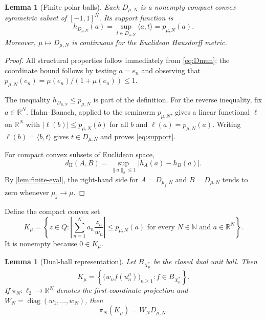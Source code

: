 \documentclass[11pt]{article}
\newtheorem{lemma}[theorem]{Lemma}
\theoremstyle{definition}
\newcommand{\N}{\mathbb N}
\newcommand{\R}{\mathbb R}
\newcommand{\ellTwo}{\ell_2}
\newcommand{\Ball}{B}
\newcommand{\Haus}{d_{\mathrm H}}
\begin{document}
\begin{lemma}[Finite polar balls]\label{lem:finite-polar}
Each $D_{\mu,N}$ is a nonempty compact convex symmetric subset of
$[-1,1]^N$.  Its support function is
\[
 h_{D_{\mu,N}}(a)=\sup_{t\in D_{\mu,N}}\langle a,t\rangle
 =p_{\mu,N}(a).
 \tag{4.6}\label{eq:support}
\]
Moreover, $\mu\mapsto D_{\mu,N}$ is continuous for the Euclidean Hausdorff
metric.
\end{lemma}

\begin{proof}
All structural properties follow immediately from \eqref{eq:Dmun}; the coordinate
bound follows by testing $a=e_n$ and observing that
$p_{\mu,N}(e_n)=\mu(e_n)/(1+\mu(e_n))\leq1$.

The inequality $h_{D_{\mu,N}}\leq p_{\mu,N}$ is part of the definition.  For the
reverse inequality, fix $a\in\R^N$.  Hahn--Banach, applied to the seminorm
$p_{\mu,N}$, gives a linear functional $\ell$ on $\R^N$ with
$|\ell(b)|\leq p_{\mu,N}(b)$ for all $b$ and $\ell(a)=p_{\mu,N}(a)$.  Writing
$\ell(b)=\langle b,t\rangle$ gives $t\in D_{\mu,N}$ and proves
\eqref{eq:support}.

For compact convex subsets of Euclidean space,
\[
 \Haus(A,B)=\sup_{\|a\|_2\leq1}|h_A(a)-h_B(a)|.
 \tag{4.7}\label{eq:haus-support}
\]
By \cref{lem:finite-eval}, the right-hand side for
$A=D_{\mu_j,N}$ and $B=D_{\mu,N}$ tends to zero whenever $\mu_j\to\mu$.
\end{proof}

Define the compact convex set
\[
 K_\mu=\left\{z\in Q:
 \left|\sum_{n=1}^N a_n\frac{z_n}{w_n}\right|
 \leq p_{\mu,N}(a)
 \text{ for every }N\in\N\text{ and }a\in\R^N\right\}.
 \tag{4.8}\label{eq:Kmu}
\]
It is nonempty because $0\in K_\mu$.

\begin{lemma}[Dual-ball representation]\label{lem:dual-rep}
Let $\Ball_{X_\mu^*}$ be the closed dual unit ball.  Then
\[
 K_\mu=
 \left\{\bigl(w_nf(u_n^\mu)\bigr)_{n\geq1}:
             f\in\Ball_{X_\mu^*}\right\}.
 \tag{4.9}\label{eq:dual-rep}
\]
If $\pi_N:\ellTwo\to\R^N$ denotes the first-coordinate projection and
$W_N=\operatorname{diag}(w_1,\ldots,w_N)$, then
\[
 \pi_N(K_\mu)=W_ND_{\mu,N}.
 \tag{4.10}\label{eq:finite-proj}
\]
\end{lemma}
\end{document}
